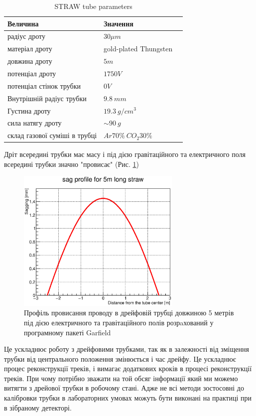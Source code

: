 \documentclass[]{article}
\begin{document}
	\begin{table}[h]
	\centering
	\begin{tabular}{|l|l|p{8cm}|}
		\hline
		Величина & Значення\\
		\hline
		радіус дроту & $30\mu m$\\
		\hline
		матеріал дроту & gold-plated Thungsten\\
		\hline
		довжина дроту & $5m$ \\
		\hline
		потенціал дроту & $1750 V$ \\
		\hline
		потенціал стінок трубки & $0 V$ \\
		\hline
		Внутрішній радіус трубки & $9.8~mm$ \\
		\hline
		Густина дроту & $19.3 ~g/cm^3$ \\
		\hline
		сила натягу дроту & $\sim 90~g$ \\
		\hline
		склад газової суміші в трубці & $Ar70\% ~CO_2 30\%$ \\
		\hline
	\end{tabular}
	\caption[Table caption text]{STRAW tube parameters }
	\label{table:straw_par}
	\end{table}
	Дріт всередині трубки має масу і під дією гравітаційного та електричного поля всередині трубки значно "провисає" (Рис. \ref{fig:sagProfile})
	
	\begin{figure}[h]
	\centering
	\includegraphics[width=0.7\textwidth]{sagProfileFit.eps}
	\caption{Профіль провисання проводу в дрейфовій трубці довжиною 5 метрів під дією електричного та гравітаційного полів розрaхований у програмному пакеті Garfield }
	\label{fig:sagProfile}
	\end{figure}	
	
	Це ускладнює роботу з дрейфовими трубками, так як в залежності від зміщення трубки від центрального положення змінюється і час дрейфу. Це ускладнює процес реконструкції треків, і вимагає додаткових кроків в процесі реконструкції треків. При чому потрібно зважати на той обсяг інформації який ми можемо витягти з дрейової трубки в робочому стані. Адже не всі методи зостосовні до калібровки трубки в лабораторних умовах можуть бути виконані на практиці при в зібраному детекторі.
	
\end{document}
